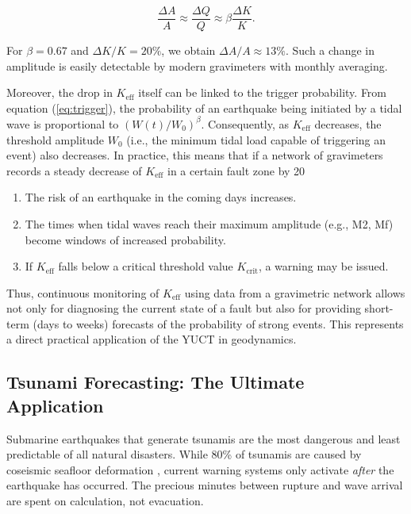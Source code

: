\documentclass[12pt,a4paper]{article}
\theoremstyle{remark}
\begin{document}
	\[
	\frac{\Delta A}{A} \approx \frac{\Delta Q}{Q} \approx \beta \frac{\Delta K}{K}.
	\]
	
	For \(\beta = 0.67\) and \(\Delta K/K = 20\%\), we obtain \(\Delta A/A \approx 13\%\). Such a change in amplitude is easily detectable by modern gravimeters with monthly averaging.
	
	Moreover, the drop in \(K_{\mathrm{eff}}\) itself can be linked to the trigger probability. From equation (\ref{eq:trigger}), the probability of an earthquake being initiated by a tidal wave is proportional to \((W(t)/W_0)^{\beta}\). Consequently, as \(K_{\mathrm{eff}}\) decreases, the threshold amplitude \(W_0\) (i.e., the minimum tidal load capable of triggering an event) also decreases. In practice, this means that if a network of gravimeters records a steady decrease of \(K_{\mathrm{eff}}\) in a certain fault zone by 20%
	
	\begin{enumerate}
		\item The risk of an earthquake in the coming days increases.
		\item The times when tidal waves reach their maximum amplitude (e.g., M2, Mf) become windows of increased probability.
		\item If \(K_{\mathrm{eff}}\) falls below a critical threshold value \(K_{\text{crit}}\), a warning may be issued.
	\end{enumerate}
	
	Thus, continuous monitoring of \(K_{\mathrm{eff}}\) using data from a gravimetric network allows not only for diagnosing the current state of a fault but also for providing short-term (days to weeks) forecasts of the probability of strong events. This represents a direct practical application of the YUCT in geodynamics.
	
	\subsection{Tsunami Forecasting: The Ultimate Application}
	\label{sec:tsunami}
	
	Submarine earthquakes that generate tsunamis are the most dangerous and least predictable of all natural disasters. While 80\% of tsunamis are caused by coseismic seafloor deformation \cite{NOAA2024, USGS2024}, current warning systems only activate \textit{after} the earthquake has occurred. The precious minutes between rupture and wave arrival are spent on calculation, not evacuation.
	
\end{document}

